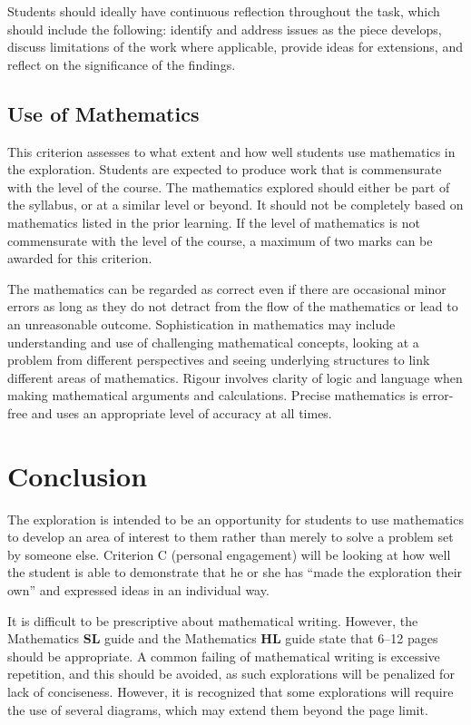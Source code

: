 \documentclass[11pt]{article}
\begin{document}
Students should ideally have continuous reflection throughout the task, which 
should include the following: identify and address issues as the piece develops, 
discuss limitations of the work where applicable, provide ideas for extensions, 
and reflect on the significance of the findings.

\subsection{Use of Mathematics}

This criterion assesses to what extent and how well students use mathematics 
in the exploration. Students are expected to produce work that is commensurate 
with the level of the course. The mathematics explored should either be part of 
the syllabus, or at a similar level or beyond. It should not be completely based 
on mathematics listed in the prior learning. If the level of mathematics is not 
commensurate with the level of the course, a maximum of two marks can be 
awarded for this criterion.

The mathematics can be regarded as correct even if there are occasional minor 
errors as long as they do not detract from the flow of the mathematics or lead 
to an unreasonable outcome. Sophistication in mathematics may include 
understanding and use of challenging mathematical concepts, looking at a 
problem from different perspectives and seeing underlying structures to link 
different areas of mathematics. Rigour involves clarity of logic and language 
when making mathematical arguments and calculations. Precise mathematics 
is error-free and uses an appropriate level of accuracy at all times.

\section{Conclusion}

The exploration is intended to be an opportunity for students to use mathematics 
to develop an area of interest to them rather than merely to solve a problem set 
by someone else. Criterion C (personal engagement) will be looking at how well 
the student is able to demonstrate that he or she has ``made the 
exploration their own'' and expressed ideas in an individual way.

It is difficult to be prescriptive about mathematical writing. However, the 
Mathematics \textbf{SL} guide and the Mathematics \textbf{HL} guide state that 
6–12 pages should be appropriate. A common failing of mathematical writing is 
excessive repetition, and this should be avoided, as such explorations will be 
penalized for lack of conciseness. However, it is recognized that some 
explorations will require the use of several diagrams, which may extend them 
beyond the page limit.
\end{document}
